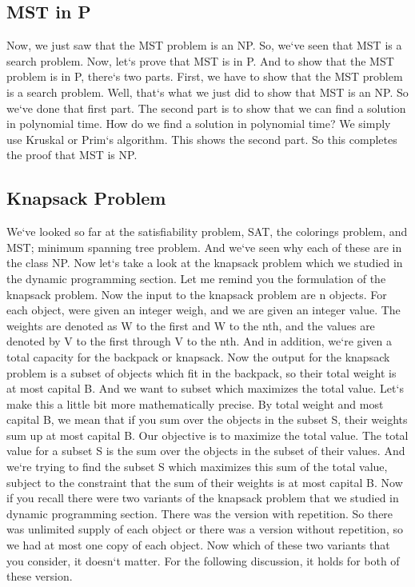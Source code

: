 \subsection{MST in P}
Now, we just saw that the MST problem is an NP\@.
So, we`ve seen that MST is a search problem.
Now, let`s prove that MST is in P\@.
And to show that the MST problem is in P, there`s two parts.
First, we have to show that the MST problem is a search problem.
Well, that`s what we just did to show that MST is an NP\@.
So we`ve done that first part.
The second part is to show that we can find a solution in polynomial time.
How do we find a solution in polynomial time? We simply use Kruskal or Prim`s algorithm.
This shows the second part.
So this completes the proof that MST is NP\@.

\subsection{Knapsack Problem}
We`ve looked so far at the satisfiability problem, SAT, the colorings problem, and MST; minimum spanning tree problem.
And we`ve seen why each of these are in the class NP\@.
Now let`s take a look at the knapsack problem which we studied in the dynamic programming section.
Let me remind you the formulation of the knapsack problem.
Now the input to the knapsack problem are n objects.
For each object, were given an integer weigh, and we are given an integer value.
The weights are denoted as W to the first and W to the nth, and the values are denoted by V to the first through V to the nth.
And in addition, we`re given a total capacity for the backpack or knapsack.
Now the output for the knapsack problem is a subset of objects which fit in the backpack, so their total weight is at most capital B\@.
And we want to subset which maximizes the total value.
Let`s make this a little bit more mathematically precise.
By total weight and most capital B, we mean that if you sum over the objects in the subset S, their weights sum up at most capital B\@.
Our objective is to maximize the total value.
The total value for a subset S is the sum over the objects in the subset of their values.
And we`re trying to find the subset S which maximizes this sum of the total value, subject to the constraint that the sum of their weights is at most capital B\@.
Now if you recall there were two variants of the knapsack problem that we studied in dynamic programming section.
There was the version with repetition.
So there was unlimited supply of each object or there was a version without repetition, so we had at most one copy of each object.
Now which of these two variants that you consider, it doesn`t matter.
For the following discussion, it holds for both of these version.

